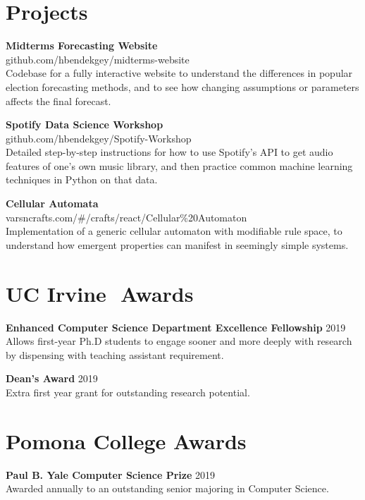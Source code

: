 \documentclass[margin]{res}
\begin{document}
\begin{resume}
\section{Projects}
\textbf{Midterms Forecasting Website}\\
github.com/hbendekgey/midterms-website\\
Codebase for a fully interactive website to understand the differences in popular election forecasting methods, and to see how changing assumptions or parameters affects the final forecast.

\textbf{Spotify Data Science Workshop}\\
github.com/hbendekgey/Spotify-Workshop\\
Detailed step-by-step instructions for how to use Spotify's API to get audio features of one's own music library, and then practice common machine learning techniques in Python on that data.

\par
\textbf{Cellular Automata}\\ 
varsncrafts.com/\#/crafts/react/Cellular\%20Automaton\\
Implementation of a generic cellular automaton with modifiable rule space, to understand how emergent properties can manifest in seemingly simple systems.

 

\section{UC Irvine\,\, Awards}

\textbf{Enhanced Computer Science Department Excellence Fellowship} \hfill 2019\\
Allows first-year Ph.D students to engage sooner and more deeply with research by dispensing with teaching assistant requirement.

\textbf{Dean's Award} \hfill 2019\\
Extra first year grant for outstanding research potential.


\section{Pomona College Awards}

\textbf{Paul B. Yale Computer Science Prize} \hfill 2019\\
Awarded annually to an outstanding senior majoring in Computer Science.


\end{resume}
\end{document}
